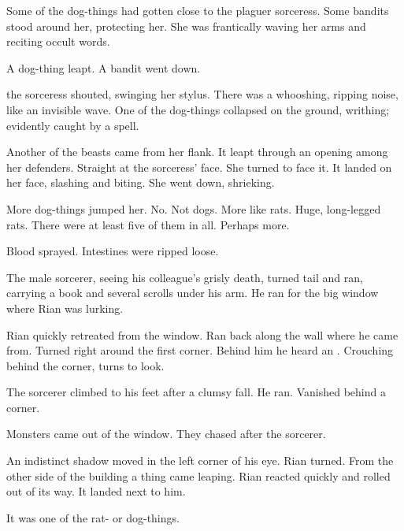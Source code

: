 Some of the dog-things had gotten close to the plaguer sorceress. 
Some bandits stood around her, protecting her. 
She was frantically waving her arms and reciting occult words. 

A dog-thing leapt. 
A bandit went down. 

 the sorceress shouted, swinging her stylus. 
There was a whooshing, ripping noise, like an invisible wave. 
One of the dog-things collapsed on the ground, writhing; evidently caught by a spell. 

Another of the beasts came from her flank. 
It leapt through an opening among her defenders. 
Straight at the sorceress' face. 
She turned to face it. 
It landed on her face, slashing and biting. 
She went down, shrieking. 

More dog-things jumped her. 
No. 
Not dogs.
More like rats. 
Huge, long-legged rats. 
There were at least five of them in all. 
Perhaps more. 

Blood sprayed. 
Intestines were ripped loose. 

The male sorcerer, seeing his colleague's grisly death, turned tail and ran, carrying a book and several scrolls under his arm. 
He ran for the big window where Rian was lurking. 


Rian quickly retreated from the window. 
Ran back along the wall where he came from. 
Turned right around the first corner. 
Behind him he heard an . 
Crouching behind the corner, turns to look. 

The sorcerer climbed to his feet after a clumsy fall. 
He ran. 
Vanished behind a corner. 

Monsters came out of the window. 
They chased after the sorcerer. 


\begin{comment}
\subsection{Rian chased by \grimrat}
\end{comment}

An indistinct shadow moved in the left corner of his eye. 
Rian turned. 
From the other side of the building a thing came leaping. 
Rian reacted quickly and rolled out of its way. 
It landed next to him. 

It was one of the rat- or dog-things. 

